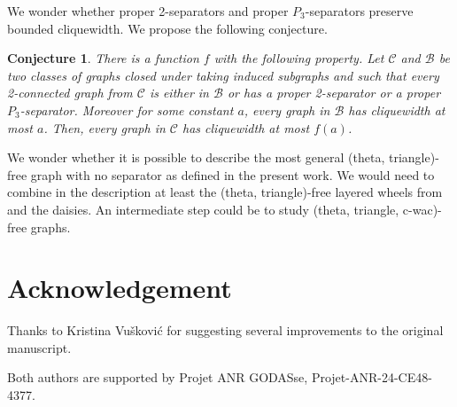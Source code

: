\documentclass[11pt]{article}
\newtheorem{conj}[theo]{Conjecture}
\begin{document}
We wonder whether proper 2-separators and proper $P_3$-separators preserve bounded cliquewidth. We propose the following conjecture.  

\begin{conj}
  There is a function $f$ with the following property. Let $\mathcal C$ and $\mathcal B$ be two classes of graphs closed under taking induced subgraphs and such that every 2-connected graph from $\mathcal C$ is either in $\mathcal B$ or has a proper 2-separator or a proper $P_3$-separator.  Moreover  for some constant $a$, every graph in $\mathcal B$ has cliquewidth at most $a$. Then, every graph in $\mathcal C$ has cliquewidth at most $f(a)$. 
\end{conj}

We wonder whether it is possible to describe the most general (theta, triangle)-free graph with no separator as defined in the present work.  We would need to combine in the description at least the (theta, triangle)-free layered wheels from \cite{DBLP:journals/jgt/SintiariT21} and the daisies.  An intermediate step could be to study (theta, triangle, c-wac)-free graphs. 

\section*{Acknowledgement}

Thanks to Kristina Vu\v skovi\'c for suggesting several improvements to the original manuscript. 

Both authors are supported by Projet ANR GODASse, Projet-ANR-24-CE48-4377.

%
%
\end{document}
